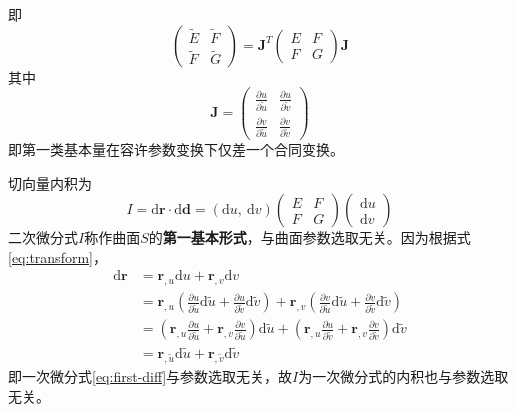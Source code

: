 即
\begin{equation}\label{eq:transform-matrix}
    \left(\begin{array}{cc} \tilde{E} & \tilde{F} \\ \tilde{F} & \tilde{G} \end{array}\right) = 
    \mathbf{J}^{T}\left(\begin{array}{cc} E & F \\ F & G \end{array}\right)\mathbf{J}
\end{equation}
其中
\begin{equation}
    \mathbf{J} = \left(\begin{array}{cc} \frac{\partial u}{\partial \tilde{u}} & \frac{\partial u}{\partial \tilde{v}} \\ 
        \frac{\partial v}{\partial \tilde{u}} & \frac{\partial v}{\partial \tilde{v}} \end{array}\right)
\end{equation}
即第一类基本量在容许参数变换下仅差一个合同变换。

切向量内积为
\begin{equation}
    I = \mathrm{d}\mathbf{r} \cdot \mathrm{d}\mathbf{d} = 
    \left(\mathrm{d}u,\ \mathrm{d}v\right)\left(\begin{array}{cc}
        E & F \\ F & G
    \end{array}\right)\left(\begin{array}{c}
        \mathrm{d}u \\ \mathrm{d}v
    \end{array}\right)
\end{equation}
二次微分式$I$称作曲面$S$的\textbf{第一基本形式}，与曲面参数选取无关。因为根据式\eqref{eq:transform}，
\begin{equation}
    \begin{aligned}
    \mathrm{d}\mathbf{r} &= \mathbf{r}_{,u}\mathrm{d}u + \mathbf{r}_{,v}\mathrm{d}v  \\
    &= \mathbf{r}_{,u}\left(\frac{\partial u}{\partial \tilde{u}}\mathrm{d}\tilde{u} + \frac{\partial u}{\partial \tilde{v}}\mathrm{d}\tilde{v}\right) + 
       \mathbf{r}_{,v}\left(\frac{\partial v}{\partial \tilde{u}}\mathrm{d}\tilde{u} + \frac{\partial v}{\partial \tilde{v}}\mathrm{d}\tilde{v}\right)  \\
    &= \left(\mathbf{r}_{,u}\frac{\partial u}{\partial \tilde{u}} + \mathbf{r}_{,v}\frac{\partial v}{\partial \tilde{u}}\right)\mathrm{d}\tilde{u} + 
       \left(\mathbf{r}_{,u}\frac{\partial u}{\partial \tilde{v}} + \mathbf{r}_{,v}\frac{\partial v}{\partial \tilde{v}}\right)\mathrm{d}\tilde{v} \\
    &= \mathbf{r}_{,\tilde{u}}\mathrm{d}\tilde{u} + \mathbf{r}_{,\tilde{v}}\mathrm{d}\tilde{v}
    \end{aligned}
\end{equation}
即一次微分式\eqref{eq:first-diff}与参数选取无关，故$I$为一次微分式的内积也与参数选取无关。


